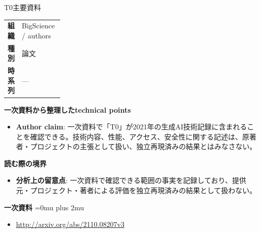\begin{technicalnote}{T0}{主要資料}
\begingroup
\begin{tabularx}{\linewidth}{@{}>{\bfseries}p{0.22\linewidth}X@{}}
組織 & BigScience / authors \\
種別 & 論文 \\
時系列 & — \\
\end{tabularx}
\smallskip
{\bfseries 一次資料から整理したtechnical points}
\begin{itemize}[leftmargin=1.5em,itemsep=0.35em]
\item \textbf{Author claim}: 一次資料で「T0」が2021年の生成AI技術記録に含まれることを確認できる。技術内容、性能、アクセス、安全性に関する記述は、原著者・プロジェクトの主張として扱い、独立再現済みの結果とはみなさない。
\end{itemize}
\begin{minipage}{\linewidth}
{\bfseries 読む際の境界}
\begin{itemize}[leftmargin=1.5em,itemsep=0.35em]
\item \textbf{分析上の留意点}: 一次資料で確認できる範囲の事実を記録しており、提供元・プロジェクト・著者による評価を独立再現済みの結果として扱わない。
\end{itemize}
\begin{samepage}
{\bfseries 一次資料}
\begingroup\sloppy
\Urlmuskip=0mu plus 2mu\relax
\begin{itemize}[leftmargin=1.5em,itemsep=0.25em]
\item {\scriptsize\url{http://arxiv.org/abs/2110.08207v3}}
\end{itemize}
\endgroup
\end{samepage}
\end{minipage}
\endgroup
\end{technicalnote}
\medskip

